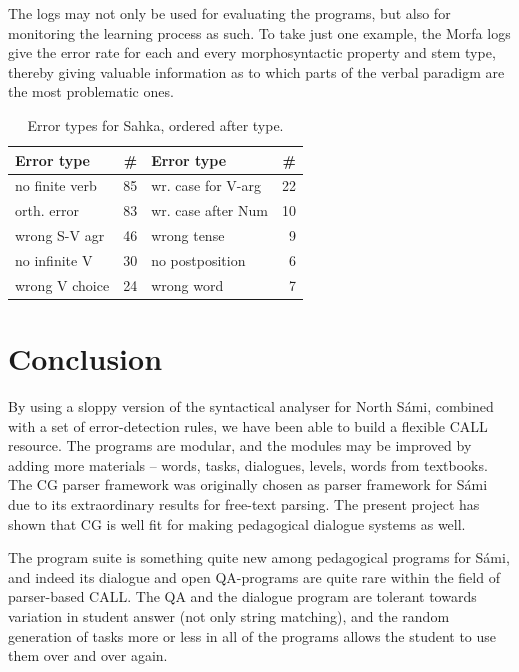 \documentclass[11pt]{article}
\begin{document}
The logs may not only be used for evaluating the programs, but also for monitoring the learning process as such. To take just one example, the Morfa logs give the error rate for each and every morphosyntactic property and stem type, thereby giving valuable information as to which parts of the verbal paradigm are the most problematic ones.

\begin{table}[htdp]
\caption{Error types for Sahka, ordered after type.}
\begin{center}
\begin{tabular}{|l|r|l|r|}
\hline
Error type & \# & Error type & \# \\
\hline												    
no finite verb    & 85 & wr. case for V-arg & 22  \\
orth. error       & 83 & wr. case after Num & 10 \\
wrong S-V agr     & 46 & wrong tense          & 9 \\
no infinite V  & 30 & no postposition      & 6 \\
wrong V choice & 24 & wrong word           & 7  \\
\hline
\end{tabular}
\end{center}
\label{log2}
\end{table}%

\section{Conclusion}

By using a sloppy version of the syntactical analyser for North Sámi, combined with a set of error-detection rules, we have been able to build a flexible CALL resource. The programs are modular, and the modules may be improved by adding more materials -- words, tasks, dialogues, levels, words from textbooks. The CG parser framework was originally chosen as parser framework for Sámi due to its extraordinary results for free-text parsing. The present project has shown that CG is well fit for making pedagogical dialogue systems as well.

The program suite is something quite new among pedagogical programs for Sámi, and indeed its dialogue and open QA-programs are quite rare within the field of parser-based CALL. %
The QA and the dialogue program are tolerant towards variation in student answer (not only string matching), and the random generation of tasks more or less in all of the programs allows the student to use them over and over again. 
\end{document}
